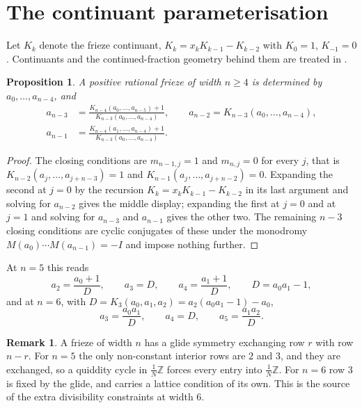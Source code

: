 \documentclass[11pt]{article}
\theoremstyle{plain}
\newtheorem{proposition}[theorem]{Proposition}
\theoremstyle{definition}
\newtheorem{remark}[theorem]{Remark}
\newcommand{\Z}{\mathbb{Z}}
\newcommand{\lat}{\tfrac{1}{N}\Z}
\begin{document}
\section{The continuant parameterisation}\label{sec:param}

Let $K_k$ denote the frieze continuant, $K_k=x_kK_{k-1}-K_{k-2}$ with $K_0=1$, $K_{-1}=0$.
Continuants and the continued-fraction geometry behind them are treated in \cite{K13}.

\begin{proposition}\label{prop:param}
A positive rational frieze of width $n\ge 4$ is determined by $a_0,\dots,a_{n-4}$, and
\begin{align*}
  a_{n-3}&=\frac{K_{n-4}(a_0,\dots,a_{n-5})+1}{K_{n-3}(a_0,\dots,a_{n-4})},\qquad
  a_{n-2}=K_{n-3}(a_0,\dots,a_{n-4}),\\
  a_{n-1}&=\frac{K_{n-4}(a_1,\dots,a_{n-4})+1}{K_{n-3}(a_0,\dots,a_{n-4})}.
\end{align*}
\end{proposition}

\begin{proof}
The closing conditions are $m_{n-1,j}=1$ and $m_{n,j}=0$ for every $j$, that is
$K_{n-2}(a_j,\dots,a_{j+n-3})=1$ and $K_{n-1}(a_j,\dots,a_{j+n-2})=0$. Expanding the second
at $j=0$ by the recursion $K_k=x_kK_{k-1}-K_{k-2}$ in its last argument and solving for
$a_{n-2}$ gives the middle display; expanding the first at $j=0$ and at $j=1$ and solving
for $a_{n-3}$ and $a_{n-1}$ gives the other two. The remaining $n-3$ closing conditions are
cyclic conjugates of these under the monodromy $M(a_0)\cdots M(a_{n-1})=-I$ and impose
nothing further.
\end{proof}

At $n=5$ this reads
\begin{equation}\label{eq:w5param}
  a_2=\frac{a_0+1}{D},\qquad a_3=D,\qquad a_4=\frac{a_1+1}{D},\qquad D=a_0a_1-1,
\end{equation}
and at $n=6$, with $D=K_3(a_0,a_1,a_2)=a_2(a_0a_1-1)-a_0$,
\begin{equation}\label{eq:w6param}
  a_3=\frac{a_0a_1}{D},\qquad a_4=D,\qquad a_5=\frac{a_1a_2}{D}.
\end{equation}

\begin{remark}\label{rem:glide}
A frieze of width $n$ has a glide symmetry exchanging row $r$ with row $n-r$. For $n=5$ the
only non-constant interior rows are $2$ and $3$, and they are exchanged, so a quiddity cycle in $\lat$
forces every entry into $\lat$. For $n=6$ row $3$ is fixed by the glide, and carries a
lattice condition of its own. This is the source of the extra divisibility constraints at
width $6$.
\end{remark}
\end{document}
